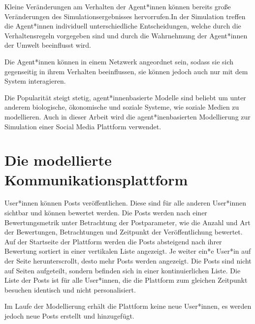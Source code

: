 Kleine Veränderungen am Verhalten der Agent*innen können bereits große Veränderungen des Simulationsergebnisses hervorrufen.In der Simulation treffen die Agent*innen individuell unterschiedliche Entscheidungen, welche durch die Verhaltensregeln vorgegeben sind und durch die Wahrnehmung der Agent*innen der Umwelt beeinflusst wird.

Die Agent*innen können in einem Netzwerk angeordnet sein, sodass sie sich gegenseitig in ihrem Verhalten beeinflussen, sie können jedoch auch nur mit dem System interagieren.


Die Popularität steigt stetig, agent*innenbasierte Modelle sind beliebt um unter anderem biologische, ökonomische und soziale Systeme, wie soziale Medien zu modellieren. Auch in dieser Arbeit wird die agent*inenbasierten Modellierung zur Simulation einer Social Media Plattform verwendet.

\section{Die modellierte Kommunikationsplattform}

User*innen können Posts veröffentlichen. Diese sind für alle anderen User*innen sichtbar und können bewertet werden. Die Posts werden nach einer Bewertungsmetrik unter Betrachtung der Postparameter, wie die Anzahl und Art der Bewertungen, Betrachtungen und Zeitpunkt der Veröffentlichung bewertet. Auf der Startseite der Plattform werden die Posts absteigend nach ihrer Bewertung sortiert in einer vertikalen Liste angezeigt. Je weiter ein*e User*in auf der Seite herunterscrollt, desto mehr Posts werden angezeigt. Die Posts sind nicht auf Seiten aufgeteilt, sondern befinden sich in einer kontinuierlichen Liste. Die Liste der Posts ist für alle User*innen, die die Plattform zum gleichen Zeitpunkt besuchen identisch und nicht personalisiert.

Im Laufe der Modellierung erhält die Plattform keine neue User*innen, es werden jedoch neue Posts erstellt und hinzugefügt.

